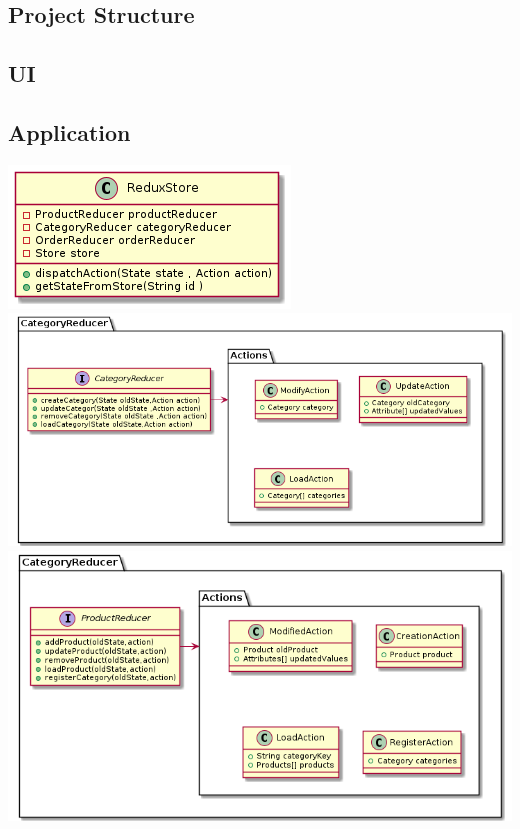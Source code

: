 \documentclass{article}
\begin{document}
\subsection{Project Structure}
\subsection{UI}

\subsection{Application}
\includegraphics[scale=0.5]{./out/ReactApp/Application/ReduxStore/Store.png}\\
\includegraphics[scale=0.5]{./out/ReactApp/Application/ProductReducer/ProductReducer.png}\\
\includegraphics[scale=0.5]{./out/ReactApp/Application/CategoryReducer/CategoryReducer.png}\\
\end{document}
